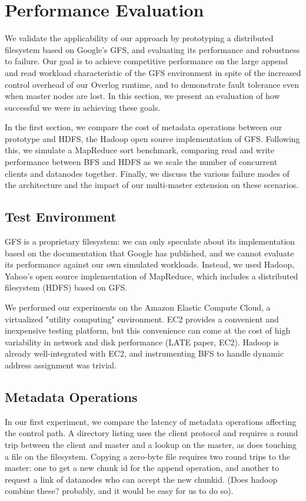 \documentclass{article}
\begin{document}
\section{Performance Evaluation}
\label{perf-eval}
We  validate the applicability of our approach by prototyping a distributed filesystem based on Google's GFS, and evaluating its performance and robustness to failure.  Our goal is to achieve competitive performance on the large append and read workload characteristic of the GFS environment in spite of the increased control overhead of our Overlog runtime, and to demonstrate fault tolerance even when master nodes are lost.  In this section, we present an evaluation of how successful we were in achieving these goals.

In the first section, we compare the cost of metadata operations between our prototype and HDFS, the Hadoop open source implementation of GFS.  Following this, we simulate a MapReduce sort benchmark, comparing read and write performance between BFS and HDFS as we 
scale the number of concurrent clients and datanodes together.  Finally, we discuss the various failure modes of the architecture and the impact of our multi-master extension on these scenarios.

\subsection{Test Environment}
GFS is a proprietary filesystem: we can only speculate about its implementation based on the documentation that Google has published, and we cannot evaluate its performance against our own simulated workloads.  Instead, we used Hadoop, Yahoo's open source implementation of MapReduce, which includes a distributed filesystem (HDFS) based on GFS.

We performed our experiments on the Amazon Elastic Compute Cloud, a virtualized "utility computing" environment.  EC2 provides a convenient and inexpensive testing platform, but this convenience can come at the cost of high variability in network and disk performance (LATE paper, EC2).  Hadoop is already well-integrated with EC2, and instrumenting BFS to handle dynamic address assignment was trivial.

\subsection{Metadata Operations}
In our first experiment, we compare the latency of metadata operations affecting the control path.  A directory listing uses the client protocol and requires a round trip between the client and master and a lookup on the master, as does touching a file on the filesystem.  Copying a zero-byte file requires two round trips to the master: one to get a new chunk id for the append operation, and another to request a link of datanodes who can accept the new chunkid.  (Does hadoop combine these?  probably, and it would be easy for us to do so).
\end{document}
